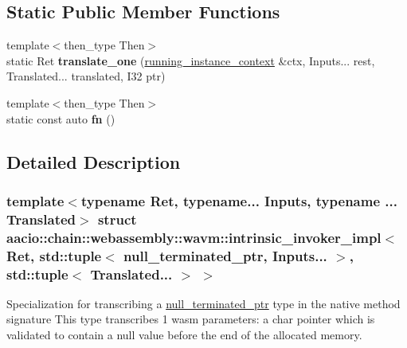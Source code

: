 \subsection*{Static Public Member Functions}
\begin{DoxyCompactItemize}
\item 
\mbox{\label{structaacio_1_1chain_1_1webassembly_1_1wavm_1_1intrinsic__invoker__impl_3_01_ret_00_01std_1_1tup91d956aba0f21670c5912ef4ca618242_a8956a2c94761cbfd8f3a9e3841f01d5c}} 
{\footnotesize template$<$then\+\_\+type Then$>$ }\\static Ret {\bfseries translate\+\_\+one} (\mbox{\hyperlink{structaacio_1_1chain_1_1webassembly_1_1wavm_1_1running__instance__context}{running\+\_\+instance\+\_\+context}} \&ctx, Inputs... rest, Translated... translated, I32 ptr)
\item 
\mbox{\label{structaacio_1_1chain_1_1webassembly_1_1wavm_1_1intrinsic__invoker__impl_3_01_ret_00_01std_1_1tup91d956aba0f21670c5912ef4ca618242_ae75599935cfc60522f43b8983f8708ae}} 
{\footnotesize template$<$then\+\_\+type Then$>$ }\\static const auto {\bfseries fn} ()
\end{DoxyCompactItemize}


\subsection{Detailed Description}
\subsubsection*{template$<$typename Ret, typename... Inputs, typename ... Translated$>$\newline
struct aacio\+::chain\+::webassembly\+::wavm\+::intrinsic\+\_\+invoker\+\_\+impl$<$ Ret, std\+::tuple$<$ null\+\_\+terminated\+\_\+ptr, Inputs... $>$, std\+::tuple$<$ Translated... $>$ $>$}

Specialization for transcribing a \mbox{\hyperlink{structaacio_1_1chain_1_1null__terminated__ptr}{null\+\_\+terminated\+\_\+ptr}} type in the native method signature This type transcribes 1 wasm parameters\+: a char pointer which is validated to contain a null value before the end of the allocated memory.


